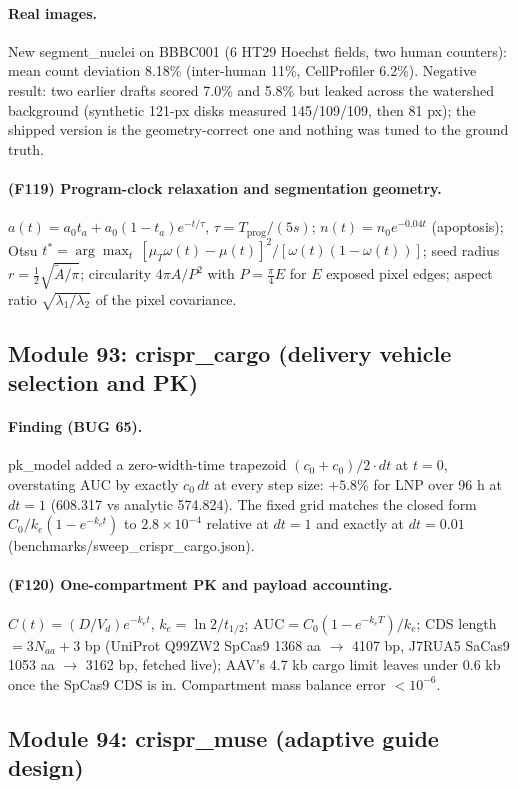 \paragraph{Real images.} New segment\_nuclei on BBBC001 (6 HT29 Hoechst fields, two human counters): mean count deviation 8.18\% (inter-human 11\%, CellProfiler 6.2\%). Negative result: two earlier drafts scored 7.0\% and 5.8\% but leaked across the watershed background (synthetic 121-px disks measured 145/109/109, then 81 px); the shipped version is the geometry-correct one and nothing was tuned to the ground truth.
\paragraph{(F119) Program-clock relaxation and segmentation geometry.} $a(t)=a_0t_a+a_0(1-t_a)e^{-t/\tau}$, $\tau=T_{\mathrm{prog}}/(5s)$; $n(t)=n_0e^{-0.04t}$ (apoptosis); Otsu $t^\ast=\arg\max_t\,[\mu_T\omega(t)-\mu(t)]^2/[\omega(t)(1-\omega(t))]$; seed radius $r=\tfrac12\sqrt{\tilde{A}/\pi}$; circularity $4\pi A/P^2$ with $P=\tfrac{\pi}{4}E$ for $E$ exposed pixel edges; aspect ratio $\sqrt{\lambda_1/\lambda_2}$ of the pixel covariance.
\subsection{Module 93: crispr\_cargo (delivery vehicle selection and PK)}
\paragraph{Finding (BUG 65).} pk\_model added a zero-width-time trapezoid $(c_0+c_0)/2\cdot dt$ at $t=0$, overstating AUC by exactly $c_0\,dt$ at every step size: $+5.8\%$ for LNP over 96 h at $dt=1$ (608.317 vs analytic 574.824). The fixed grid matches the closed form $C_0/k_e(1-e^{-k_e t})$ to $2.8\times10^{-4}$ relative at $dt=1$ and exactly at $dt=0.01$ (benchmarks/sweep\_crispr\_cargo.json).
\paragraph{(F120) One-compartment PK and payload accounting.} $C(t)=(D/V_d)e^{-k_e t}$, $k_e=\ln2/t_{1/2}$; $\mathrm{AUC}=C_0(1-e^{-k_e T})/k_e$; CDS length $=3N_{aa}+3$ bp (UniProt Q99ZW2 SpCas9 1368 aa $\to$ 4107 bp, J7RUA5 SaCas9 1053 aa $\to$ 3162 bp, fetched live); AAV's 4.7 kb cargo limit leaves under 0.6 kb once the SpCas9 CDS is in. Compartment mass balance error $<10^{-6}$.
\subsection{Module 94: crispr\_muse (adaptive guide design)}
